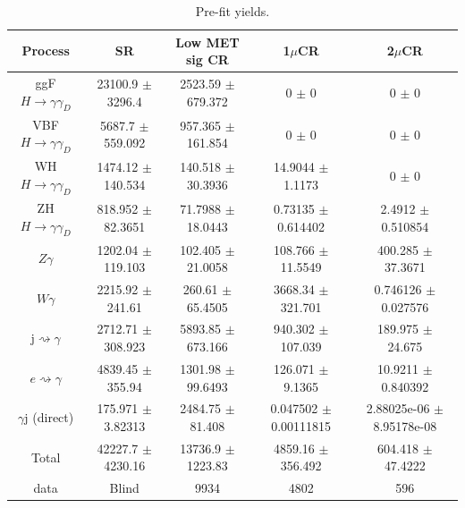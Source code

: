\begin{table}[htpb!]

\centering
\begin{tabular}{c|cccc}
\hline
\textbf{Process} & \textbf{SR}& \textbf{Low MET sig CR} & \textbf{1$\mu$CR} & \textbf{2$\mu$CR} \\
\hline
  ggF $H\to\gamma\gamma_D$   & 23100.9 $\pm$ 3296.4 & 2523.59 $\pm$ 679.372 & 0 $\pm$ 0 & 0 $\pm$ 0 \\ 
  VBF $H\to\gamma\gamma_D$   & 5687.7 $\pm$ 559.092 & 957.365 $\pm$ 161.854 & 0 $\pm$ 0 & 0 $\pm$ 0 \\ 
  WH $H\to\gamma\gamma_D$  & 1474.12 $\pm$ 140.534 & 140.518 $\pm$ 30.3936 & 14.9044 $\pm$ 1.1173 & 0 $\pm$ 0 \\ 
  ZH $H\to\gamma\gamma_D$   & 818.952 $\pm$ 82.3651 & 71.7988 $\pm$ 18.0443 & 0.73135 $\pm$ 0.614402 & 2.4912 $\pm$ 0.510854 \\ 
  $Z\gamma$   & 1202.04 $\pm$ 119.103 & 102.405 $\pm$ 21.0058 & 108.766 $\pm$ 11.5549 & 400.285 $\pm$ 37.3671 \\ 
  $W\gamma$   & 2215.92 $\pm$ 241.61 & 260.61 $\pm$ 65.4505 & 3668.34 $\pm$ 321.701 & 0.746126 $\pm$ 0.027576 \\ 
  j$\rightsquigarrow\gamma$   & 2712.71 $\pm$ 308.923 & 5893.85 $\pm$ 673.166 & 940.302 $\pm$ 107.039 & 189.975 $\pm$ 24.675 \\ 
  $e\rightsquigarrow\gamma$   & 4839.45 $\pm$ 355.94 & 1301.98 $\pm$ 99.6493 & 126.071 $\pm$ 9.1365 & 10.9211 $\pm$ 0.840392 \\ 
  $\gamma$j (direct)   & 175.971 $\pm$ 3.82313 & 2484.75 $\pm$ 81.408 & 0.047502 $\pm$ 0.00111815 & 2.88025e-06 $\pm$ 8.95178e-08 \\ 
\hline 
  Total  & 42227.7 $\pm$ 4230.16 & 13736.9 $\pm$ 1223.83 & 4859.16 $\pm$ 356.492 & 604.418 $\pm$ 47.4222 \\ 
\hline 
  data   & Blind & 9934 & 4802 & 596 \\ \hline

\end{tabular}
\caption{Pre-fit yields.}
\label{tab:yields_pre_syst}
\end{table}

